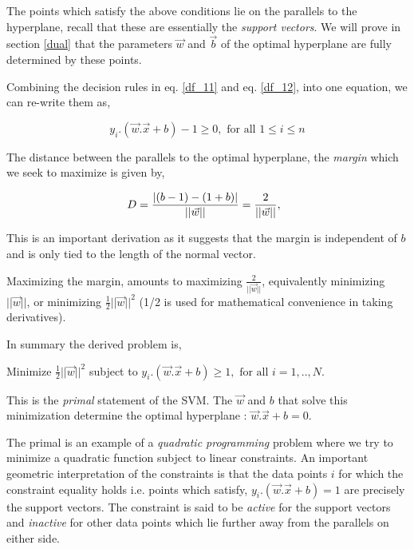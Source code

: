 \documentclass[final,3p,times,twocolumn]{elsarticle}
\begin{document}
The points which satisfy the above conditions lie on the parallels to the hyperplane, recall that these are essentially the \textit{support vectors}. We will prove in section \ref{dual} that the parameters $\vec{w}$ and $\vec{b}$ of the optimal hyperplane are fully determined by these points.

Combining the decision rules in eq. \ref{df_11} and eq. \ref{df_12}, into one equation, we can re-write them as, 

\begin{equation}
\label{constraints}
y_{i}.(\vec{w}.\vec{x} + b) - 1 \geqslant 0, \textrm{ for all } 1 \leqslant i \leqslant n
\end{equation} 

The distance between the parallels to the optimal hyperplane, the \textit{margin} which we seek to maximize is given by,

\begin{equation}
D = \frac{|(b - 1) - (1 + b)|}{||\vec{w}||} = \frac{2}{||\vec{w}||}, \hspace{2mm} 
\end{equation}

This is an important derivation as it suggests that the margin is independent of $b$ and is only tied to the length of the normal vector. 

Maximizing the margin, amounts to maximizing  $\frac{\displaystyle 2}{||\displaystyle \vec{w}||}$, equivalently minimizing $||\vec{w}||$, or minimizing $\frac{\displaystyle 1}{\displaystyle 2}||\vec{w}||^{2}$ (1/2 is used for mathematical convenience in taking derivatives).

In summary the derived problem is, 

Minimize $\frac{\displaystyle 1}{\displaystyle 2}||\vec{w}||^{2}$ subject to $y_{i}.(\vec{w}.\vec{x} + b) \geqslant 1, \textrm{ for all } i = 1,..,N$.

This is the \textit{primal} statement of the SVM. The $\vec{w}$ and $b$ that solve this minimization determine the optimal hyperplane : $\vec{w}.\vec{x} + b = 0$. 

The primal is an example of a \textit{quadratic programming} problem where we try to minimize a quadratic function subject to linear constraints. An important geometric interpretation of the constraints is that the data points $i$ for which the constraint equality holds i.e. points which satisfy, $y_{i}.(\vec{w}.\vec{x} + b) = 1$ are precisely the support vectors. The constraint is said to be \textit{active} for the support vectors and \textit{inactive} for other data points which lie further away from the parallels on either side. 
\end{document}
